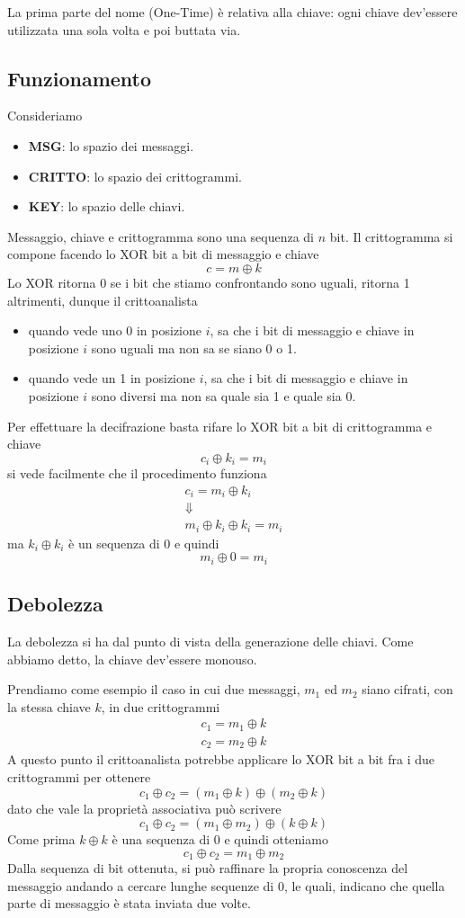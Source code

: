 La prima parte del nome (One-Time) \`e relativa alla chiave: ogni chiave dev'essere utilizzata una sola volta e poi
buttata via.

\subsection{Funzionamento}\label{funzionamento_otp}
Consideriamo
\begin{itemize}
	\item \textbf{MSG}: lo spazio dei messaggi.
	\item \textbf{CRITTO}: lo spazio dei crittogrammi.
	\item \textbf{KEY}: lo spazio delle chiavi.
\end{itemize}
Messaggio, chiave e crittogramma sono una sequenza di $n$ bit. Il crittogramma si compone facendo lo XOR bit a bit di
messaggio e chiave
\[ c = m \oplus k \]
Lo XOR ritorna 0 se i bit che stiamo confrontando sono uguali, ritorna 1 altrimenti, dunque il crittoanalista
\begin{itemize}
	\item quando vede uno 0 in posizione $i$, sa che i bit di messaggio e chiave in posizione $i$ sono uguali
	      ma non sa se siano 0 o 1.
	\item quando vede un 1 in posizione $i$, sa che i bit di messaggio e chiave in posizione $i$ sono diversi
	      ma non sa quale sia 1 e quale sia 0.
\end{itemize}
Per effettuare la decifrazione basta rifare lo XOR bit a bit di crittogramma e chiave
\[ c_i \oplus k_i = m_i \]
si vede facilmente che il procedimento funziona
\begin{gather*}
	c_i = m_i \oplus k_i \\
	\Downarrow \\
	m_i \oplus k_i \oplus k_i = m_i
\end{gather*}
ma $k_i \oplus k_i$ \`e un sequenza di 0 e quindi
\[ m_i \oplus 0 = m_i \]

\subsection{Debolezza}\label{debolezza_otp}
La debolezza si ha dal punto di vista della generazione delle chiavi. Come abbiamo detto, la chiave dev'essere monouso.

Prendiamo come esempio il caso in cui due messaggi, $m_1$ ed $m_2$ siano cifrati, con la stessa chiave $k$, in due
crittogrammi
\begin{gather*}
	c_1 = m_1 \oplus k \\
	c_2 = m_2 \oplus k
\end{gather*}
A questo punto il crittoanalista potrebbe applicare lo XOR bit a bit fra i due crittogrammi per ottenere
\[ c_1 \oplus c_2 = (m_1 \oplus k) \oplus (m_2 \oplus k) \]
dato che vale la propriet\`a associativa pu\`o scrivere
\[ c_1 \oplus c_2 = (m_1 \oplus m_2) \oplus (k \oplus k) \]
Come prima $k \oplus k$ \`e una sequenza di 0 e quindi otteniamo
\[ c_1 \oplus c_2 = m_1 \oplus m_2 \]
Dalla sequenza di bit ottenuta, si pu\`o raffinare la propria conoscenza del messaggio andando a cercare lunghe sequenze
di 0, le quali, indicano che quella parte di messaggio \`e stata inviata due volte.

